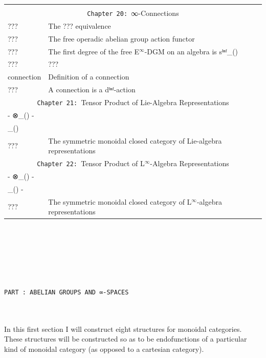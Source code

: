 \documentclass{book}
\theoremstyle{definition}
\newcounter{pcounter}
\newcounter{partcount}
\renewcommand{\part}[1]{
\newpage
{
\Huge 
\begin{center}
\ \\
\ \\
\ \\
\ \\
\ \\
\ \\
\thispagestyle{empty}
\texttt{PART {\thepartcount}: #1}
\stepcounter{partcount}
\end{center}}
\ \\
\ \\
}
\begin{document}
{\begin{longtable}{|| l || l ||}
\hline \hline
 & \\
\hline
 & \\
\hline \hline
\multicolumn{2}{||c||}{\texttt{Chapter 20: }∞-Connections} \\
\hline \hline
??? & The ??? equivalence \\
\hline
??? & The free operadic abelian group action functor \\
\hline
??? & The first degree of the free E${}^{\infty}$-DGM on an algebra is sⁱⁿᶠ\_() \\
\hline
???  & ??? \\
\hline
connection & Definition of a connection \\
\hline
??? & A connection is a dⁱⁿᶠ-action\\
\hline \hline
\multicolumn{2}{||c||}{\texttt{Chapter 21: }Tensor Product of Lie-Algebra Representations} \\
\hline \hline
- ⊗\_() - &  \\
\hline
[-,-]\_() &  \\
\hline
??? & The symmetric monoidal closed category of Lie-algebra representations \\
\hline \hline
\multicolumn{2}{||c||}{\texttt{Chapter 22: }Tensor Product of L${}^{\infty}$-Algebra Representations} \\
\hline \hline
- ⊗\_() -  &  \\
 \hline
[-,-]\_() - &  \\
 \hline
??? & The symmetric monoidal closed category of L${}^{\infty}$-algebra representations\\
 \hline \hline
\end{longtable}
}



\part{ABELIAN GROUPS AND ∞-SPACES}

In this first section I will construct eight structures for monoidal categories. These structures will be constructed so as to be endofunctions of a particular kind of monoidal category (as opposed to a cartesian category).\\
\end{document}
